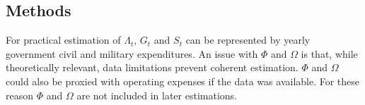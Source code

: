 \documentclass[12pt]{article}
\begin{document}
\begin{spacing}{1.5}











\section*{Methods}

For practical estimation of $\Lambda_t$, $G_t$ and $S_t$ can be represented by yearly government civil and military expenditures. An issue with $\Phi$ and $\Omega$ is that, while theoretically relevant, data limitations prevent coherent estimation. $\Phi$ and $\Omega$ could also be proxied with operating expenses if the data was available. For these reason $\Phi$ and $\Omega$ are not included in later estimations. 




\end{spacing}
\end{document}
